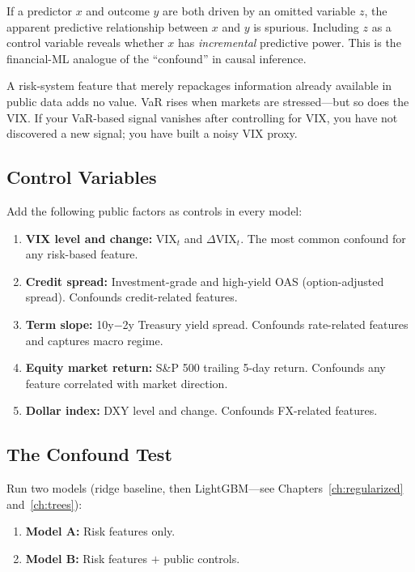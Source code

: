 \begin{prereq}
If a predictor $x$ and outcome $y$ are both driven by an omitted
variable $z$, the apparent predictive relationship between $x$ and $y$
is spurious.  Including $z$ as a control variable reveals whether $x$
has \emph{incremental} predictive power.  This is the financial-ML
analogue of the ``confound'' in causal inference.
\end{prereq}

A risk-system feature that merely repackages information already
available in public data adds no value.  VaR rises when markets are
stressed---but so does the VIX.  If your VaR-based signal vanishes
after controlling for VIX, you have not discovered a new signal; you
have built a noisy VIX proxy.

\subsection{Control Variables}

Add the following public factors as controls in every model:

\begin{enumerate}[nosep]
  \item \textbf{VIX level and change:} $\text{VIX}_t$ and
        $\Delta\text{VIX}_t$.  The most common confound for any
        risk-based feature.
  \item \textbf{Credit spread:} Investment-grade and high-yield OAS
        (option-adjusted spread).  Confounds credit-related features.
  \item \textbf{Term slope:} 10y$-$2y Treasury yield spread.  Confounds
        rate-related features and captures macro regime.
  \item \textbf{Equity market return:} S\&P 500 trailing 5-day return.
        Confounds any feature correlated with market direction.
  \item \textbf{Dollar index:} DXY level and change.  Confounds
        FX-related features.
\end{enumerate}

\subsection{The Confound Test}

Run two models (ridge baseline, then LightGBM---see
Chapters~\ref{ch:regularized} and~\ref{ch:trees}):

\begin{enumerate}[nosep]
  \item \textbf{Model A:} Risk features only.
  \item \textbf{Model B:} Risk features $+$ public controls.
\end{enumerate}

